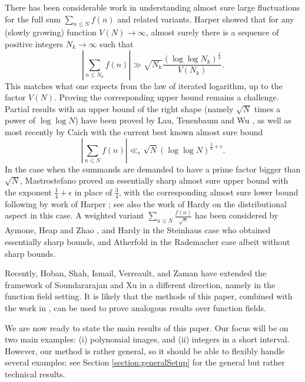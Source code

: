\documentclass[11pt]{tran-l}
\theoremstyle{definition}
\theoremstyle{remark}
\numberwithin{equation}{section}
\begin{document}
There has been considerable work in understanding almost sure large fluctuations for the full sum $\sum_{n\leq N} f(n)$ and related variants. Harper \cite{Harper2023_ASLF} showed that for any (slowly growing) function $V(N)\to\infty$, almost surely there is a sequence of positive integers $N_k\to\infty$ such that 
\begin{equation*}
    \left\lvert\sum_{n\leq N_k}f(n)\right\rvert\gg\sqrt{N_k}\frac{(\log\log N_k)^{\frac14}}{V(N_k)}.
\end{equation*}
This matches what one expects from the law of iterated logarithm, up to the factor $V(N)$. Proving the corresponding upper bound remains a challenge. Partial results with an upper bound of the right shape (namely $\sqrt N$ times a power of $\log\log N$) have been proved by Lau, Tenenbaum and Wu \cite{LauTenenbaumWu2013MeanValuesRMF}, as well as most recently by Caich \cite{Caich2023} with the current best known almost sure bound
\begin{equation*}
    \left\lvert\sum_{n\leq N} f(n)\right\rvert\ll_{\epsilon} \sqrt N(\log\log N)^{\frac{3}{4}+\epsilon}.
\end{equation*}
In the case when the summands are demanded to have a prime factor bigger than $\sqrt N$, Mastrostefano \cite{Mastrostefano2022} proved an essentially sharp almost sure upper bound with the exponent $\frac{1}{4}+\epsilon$ in place of $\frac{3}4$, with the corresponding almost sure lower bound following by work of Harper \cite{Harper2023_ASLF}; see also the work of Hardy \cite{Hardy2025LargePrime} on the distributional aspect in this case. A weighted variant $\sum_{n\leq N} \frac{f(n)}{\sqrt n}$
has been considered by Aymone, Heap and Zhao \cite{aymone2021partial}, and Hardy \cite{Hardy2023AlmostSure} in the Steinhaus case who obtained essentially sharp bounds, and Atherfold \cite{Atherfold2025} in the Rademacher case albeit without sharp bounds.

Recently, Hoban, Shah, Ismail, Verreault, and Zaman \cite{HobanShahIsmailVerreaultZaman2025} have extended the framework of Soundararajan and Xu \cite{soundararajan2023clt} in a different direction, namely in the function field setting. It is likely that the methods of this paper, combined with the work in \cite{HobanShahIsmailVerreaultZaman2025}, can be used to prove analogous results over function fields.

We are now ready to state the main results of this paper. Our focus will be on two main examples: (i) polynomial images, and (ii) integers in a short interval. However, our method is rather general, so it should be able to flexibly handle several examples; see Section \ref{section:generalSetup} for the general but rather technical results. 
\end{document}
